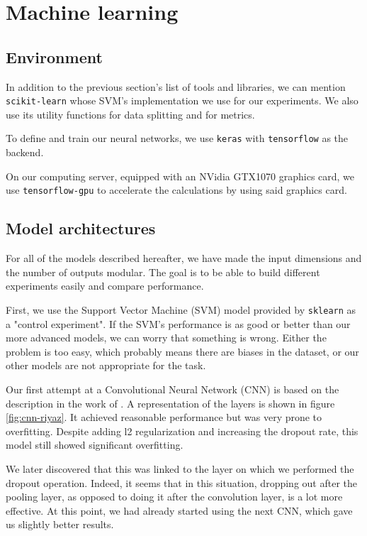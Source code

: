 \section{Machine learning}

\subsection{Environment}

In addition to the previous section's list of tools and libraries, we can mention \texttt{scikit-learn} whose SVM's implementation we use for our experiments. We also use its utility functions for data splitting and for metrics.

To define and train our neural networks, we use \texttt{keras} with \texttt{tensorflow} as the backend.

On our computing server, equipped with an NVidia GTX1070 graphics card, we use \texttt{tensorflow-gpu} to accelerate the calculations by using said graphics card.

\subsection{Model architectures}

For all of the models described hereafter, we have made the input dimensions and the number of outputs modular. The goal is to be able to build different experiments easily and compare performance.

First, we use the Support Vector Machine (SVM) model provided by \texttt{sklearn} as a "control experiment". If the SVM's performance is as good or better than our more advanced models, we can worry that something is wrong. Either the problem is too easy, which probably means there are biases in the dataset, or our other models are not appropriate for the task.

Our first attempt at a Convolutional Neural Network (CNN) is based on the description in the work of \textcite{riyaz_deep_2018}. A representation of the layers is shown in figure \ref{fig:cnn-riyaz}. It achieved reasonable performance but was very prone to overfitting. Despite adding l2 regularization and increasing the dropout rate, this model still showed significant overfitting.

We later discovered that this was linked to the layer on which we performed the dropout operation. Indeed, it seems that in this situation, dropping out after the pooling layer, as opposed to doing it after the convolution layer, is a lot more effective. At this point, we had already started using the next CNN, which gave us slightly better results.


